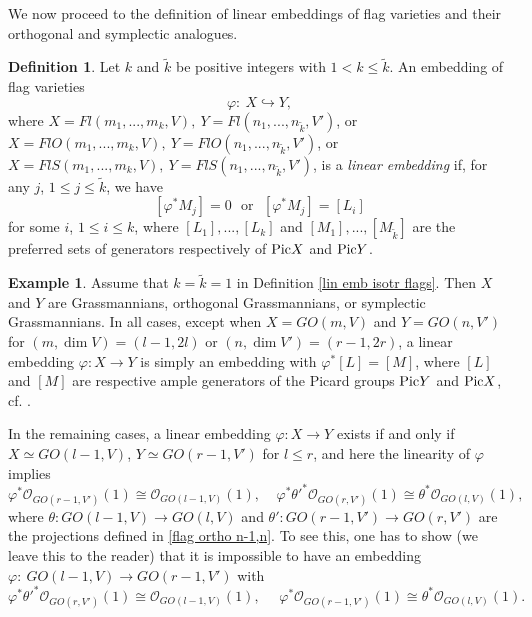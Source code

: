 \documentclass[12pt]{amsart}
\renewcommand{\phi}{\varphi}
\theoremstyle{definition}
\newtheorem{definition}[theorem]{Definition}
\newtheorem{example}[theorem]{Example}
\begin{document}
We now proceed to the definition of linear embeddings of flag 
varieties and their orthogonal and symplectic analogues.

\begin{definition}\label{lin emb isotr flags}
Let $k$ and $\tilde{k}$ be positive integers with $1<k\le
\tilde{k}$. An embedding of flag varieties 
\begin{equation*}\label{usual embedding}
\varphi:\ X\hookrightarrow Y,
\end{equation*}
where $X=Fl(m_1,...,m_k,V),\ Y=Fl(n_1,...,n_{\tilde{k}},V')$,
or $X=FlO(m_1,...,m_k,V),\ Y=FlO(n_1,...,n_{\tilde{k}},V')$,
or $X=FlS(m_1,...,m_k,V),\ Y=FlS(n_1,...,n_{\tilde{k}},V')$,
is a \textit{linear embedding} if, for any $j$, $1\le j\le\tilde{k}$, we have
\begin{equation*}\label{linearity}
[\varphi^*M_j]=0\ \ \ \textrm{or}\ \ \  [\varphi^*M_j]=[L_i]
\end{equation*}
for some $i$, $1\le i\le k$, where $[L_1],...,[L_k]$ and 
$[M_1],...,[M_{\tilde{k}}]$ are the preferred sets of 
generators respectively of ${\rm{Pic}}X$ and ${\rm{Pic}}Y$.
\end{definition}



\begin{example}\label{lin emb isotr Grass}
Assume that $k=\tilde{k}=1$ in Definition \ref{lin emb
isotr flags}. Then $X$ and $Y$ are Grassmannians, orthogonal 
Grassmannians, or symplectic Grassmannians. In all cases, 
except when $X=GO(m,V)$ and $Y=GO(n,V')$ for $(m,\dim V)=
(l-1,2l)$ or $(n,\dim V')=(r-1,2r)$, a linear embedding 
$\varphi:X\to Y$ is simply an embedding with $\varphi^*[L]=
[M]$, where $[L]$ and $[M]$ are respective ample generators of the Picard groups ${\rm{Pic}}Y$ and ${\rm{Pic}}X$, 
cf. \cite[Def. 2.1]{PT}.

In the remaining cases, a linear embedding $\varphi:X\to Y$   
exists if and only if $X\simeq GO(l-1,V)$, $Y\simeq GO(r-1,V'
)$ for $l\le r$, and here the linearity of $\phi$ implies 
$$
\phi^*\mathcal{O}_{GO(r-1,V')}(1)\cong\mathcal{O}_{GO(l-1,V)}
(1), \ \ \ \ \ \varphi^*\theta'^{*}\mathcal{O}_{GO(r,V')}(1)\cong
\theta^*\mathcal{O}_{GO(l,V)}(1),
$$ 
where $\theta:GO(l-1,V)\to 
GO(l,V)$ 
and $\theta': GO(r-1,V')\to GO(r,V')$ are the projections 
defined in \eqref{flag ortho n-1,n}. To see this, one has to
show (we leave this to the reader) that it is impossible to
have an embedding $\phi:\ GO(l-1,V)\to GO(r-1,V')$ with
$$
\varphi^*\theta'^{*}\mathcal{O}_{GO(r,V')}(1)\cong
\mathcal{O}_{GO(l-1,V)}(1), \ \ \ \ \ \ \phi^*\mathcal{O}_{GO(r-1,
V')}(1)\cong\theta^*\mathcal{O}_{GO(l,V)}(1).
$$
\end{example}
\end{document}
